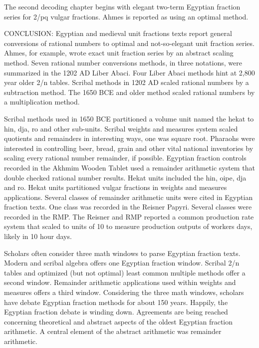 \documentclass[12pt]{article}
\begin{document}
The second decoding chapter begins with elegant two-term Egyptian fraction series for 2/pq vulgar fractions. Ahmes is reported as using an optimal  method.

CONCLUSION: Egyptian and medieval unit fractions texts report general conversions of rational numbers to optimal and not-so-elegant unit fraction series. Ahmes, for example, wrote exact unit fraction series by an abstract scaling method. Seven rational number conversions methods, in three notations, were summarized in the 1202 AD Liber Abaci. Four Liber Abaci methods hint at 2,800 year older 2/n tables. Scribal methods in 1202 AD scaled rational numbers by a subtraction method. The 1650 BCE and older method scaled rational numbers by a multiplication method. 

Scribal methods used in 1650 BCE partitioned a volume unit named the hekat to hin, dja, ro and other sub-units. Scribal weights and measures system scaled quotients and remainders in interesting ways, one was square root. Pharaohs were interested in controlling beer, bread, grain and other vital national inventories by scaling every rational number remainder, if possible. Egyptian fraction controls recorded in the Akhmim Wooden Tablet used a remainder arithmetic system that double checked rational number results. Hekat units included the hin, oipe, dja and ro. Hekat units partitioned vulgar fractions in weights and measures applications. Several classes of remainder arithmetic units were cited in Egyptian fraction texts. One class was recorded in the Reisner Papyri. Several classes were recorded in the RMP. The Reisner and RMP reported a common production rate system that scaled to units of 10 to measure production outputs of workers days, likely in 10 hour days.

Scholars often consider three math windows to parse Egyptian fraction texts. Modern and scribal algebra offers one Egyptian fraction window. Scribal 2/n tables and optimized (but not optimal) least common multiple methods offer a second window. Remainder arithmetic applications used within weights and measures offers a third window. Considering the three math windows, scholars have debate Egyptian fraction methods for about 150 years. Happily, the Egyptian fraction debate is winding down. Agreements are being reached concerning theoretical and abstract aspects of the oldest Egyptian fraction arithmetic. A central element of the abstract arithmetic was  remainder arithmetic. 
\end{document}
